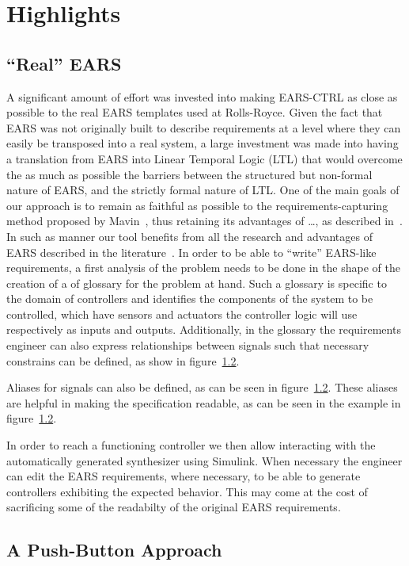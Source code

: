 \section{Highlights}

\subsection{``Real'' EARS}

A significant amount of effort was invested into making \textsf{EARS-CTRL} as close as
possible to the real EARS templates used at Rolls-Royce. Given the fact that
EARS was not originally built to describe requirements at a level where they can
easily be transposed into a real system, a large investment was made into having
a translation from EARS into Linear Temporal Logic (LTL) that would overcome the
as much as possible the barriers between the structured but non-formal nature of
EARS, and the strictly formal nature of LTL. One of the main goals of our
approach is to remain as faithful as possible to the requirements-capturing
method proposed by Mavin~\cite{}, thus retaining its advantages of \ldots, as
described in~\cite{}. In such as manner our tool benefits from all the research
and advantages of EARS described in the literature~\cite{}. In order to be able
to ``write'' EARS-like requirements, a first analysis of the problem needs to be
done in the shape of the creation of a of glossary for the problem at hand. Such
a glossary is specific to the domain of controllers and identifies the
components of the system to be controlled, which have sensors and actuators the
controller logic will use respectively as inputs and outputs. Additionally, in
the glossary the requirements engineer can also express relationships between 
signals such that necessary constrains can be defined, as show in figure~\ref{}.

Aliases for signals can also be defined, as can be seen in figure~\ref{}. These
aliases are helpful in making the specification readable, as can be seen in the
example in figure~\ref{}.

In order to reach a functioning controller we then allow interacting with the
automatically generated synthesizer using Simulink. When necessary the engineer
can edit the EARS requirements, where necessary, to be able to generate
controllers exhibiting the expected behavior. This may come at the cost of
sacrificing some of the readabilty of the original EARS
requirements.

\subsection{A Push-Button Approach}

